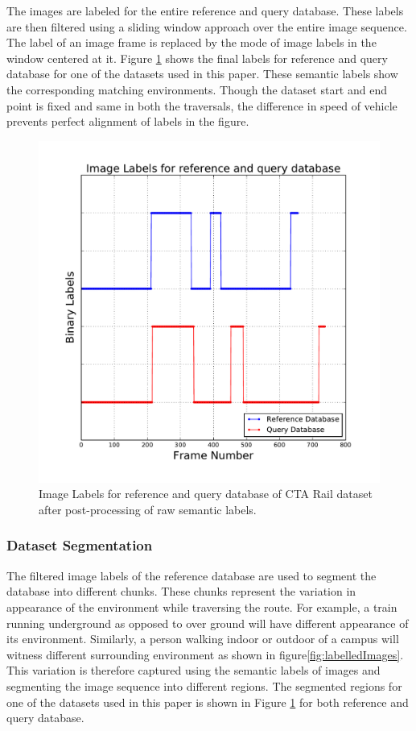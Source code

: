 \documentclass[twocolumn]{article}
\begin{document}
The images are labeled for the entire reference and query database. These labels are then filtered using a sliding window approach over the entire image sequence. The label of an image frame is replaced by the mode of image labels in the window centered at it. Figure \ref{fig:datasetLabels} shows the final labels for reference and query database for one of the datasets used in this paper. These semantic labels show the corresponding matching environments. Though the dataset start and end point is fixed and same in both the traversals, the difference in speed of vehicle prevents perfect alignment of labels in the figure.

\begin{figure}[!htbp]
 \includegraphics[scale=0.45]{cta-rail-imageLabels}
 \caption{Image Labels for reference and query database of CTA Rail dataset after post-processing of raw semantic labels.}
 \label{fig:datasetLabels}
\end{figure}


\subsubsection{Dataset Segmentation}
The filtered image labels of the reference database are used to segment the database into different chunks. These chunks represent the variation in appearance of the environment while traversing the route. For example, a train running underground as opposed to over ground will have different appearance of its environment. Similarly, a person walking indoor or outdoor of a campus will witness different surrounding environment as shown in figure\ref{fig:labelledImages}. This variation is therefore captured using the semantic labels of images and segmenting the image sequence into different regions. The segmented regions for one of the datasets used in this paper is shown in Figure \ref{fig:datasetLabels} for both reference and query database.
\end{document}

